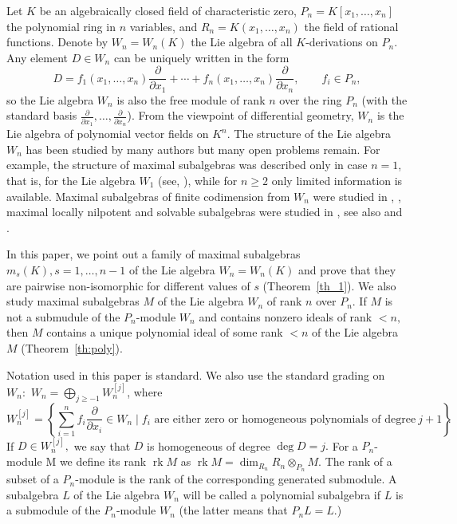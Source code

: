 \documentclass[12pt,a4paper]{amsart}
\theoremstyle{plain}
\theoremstyle{definition}
\DeclareMathOperator{\rk}{rk}
\begin{document}
Let $K$ be an algebraically closed field of characteristic zero,
$P_n=K[x_1,\ldots,x_n]$ the polynomial ring in $n$ variables, and $R_n=K(x_1, \ldots , x_n)$ the field of rational functions. Denote by 
$W_n=W_n(K)$ the Lie algebra of all $K$-derivations on $P_n$.
Any element $D\in W_n$ can be uniquely written in the form
\[
D=f_1(x_1,\ldots,x_n)\frac{\partial}{\partial x_1}
+\cdots+
f_n(x_1,\ldots,x_n)\frac{\partial}{\partial x_n},
\qquad f_i\in P_n,
\]
so the Lie algebra $W_n$ is also the free module of rank $n$ over the ring $P_n$ (with the standard basis $\frac{\partial}{\partial x_1}, \ldots , \frac{\partial}{\partial x_n} $).
From the viewpoint of differential geometry, $W_n$ is the Lie algebra
of polynomial vector fields on $K^n$.
The structure of the Lie algebra $W_n$ has been  studied by many authors
but  many open problems remain.
For example, the structure of maximal subalgebras was described only
in case $n=1$, that is,  for the Lie algebra $W_1$ (see, \cite{Bell}), while for $n\ge2$
only  limited information is available.
Maximal subalgebras of finite codimension from $W_n$ were studied in
\cite{Rudak1}, \cite{Rudak2}, maximal locally nilpotent and solvable subalgebras were
studied in \cite{ESS}, see also \cite{MP} and \cite{Bavula}.

In this paper, we point out a family of maximal subalgebras
$m_s(K),  s=1, \ldots, n-1$ of the Lie algebra $W_n=W_n(K)$ and prove that they are pairwise
non-isomorphic for different values of  $s$ (Theorem~\ref{th_1}).
We also study maximal subalgebras $M$ of the Lie algebra $W_n$ of rank $n$ over $P_n$. If $M$ is not a submudule of the $P_n$-module $W_n$ and contains nonzero ideals of rank $<n,$ then $M$ contains a unique polynomial ideal of some rank $<n$ of the Lie algebra $M$ 
(Theorem~\ref{th:poly}).

Notation used in this paper is standard. 
We also use the standard grading on $W_n :$ 
 ${W_n = \bigoplus_{j \ge -1} W^{[j]}_n}$,
where 
$$W^{[j]}_n = \left \{
\sum_{i=1}^n f_i \frac{\partial}{\partial x_i} \in W_n \mid 
f_i \text{ are either zero or homogeneous polynomials of degree} \  j+1 \right \}.$$ 
If $D\in W^{[j]}_n,$  we say that $D$ is homogeneous of degree $\deg D=j. $
 For a $P_n$-module M we define its rank $\rk M$ as $\rk M = \dim_{R_n} R_n \otimes_{P_n} M$.
 The rank of a subset of a $P_n$-module is the rank of the corresponding generated submodule. A subalgebra $L$  of the Lie algebra $W_n$ will be called a polynomial subalgebra if $L$ is a submodule of the  $P_n$-module $W_n$  (the latter means that $P_nL=L$.) 
 
\end{document}
